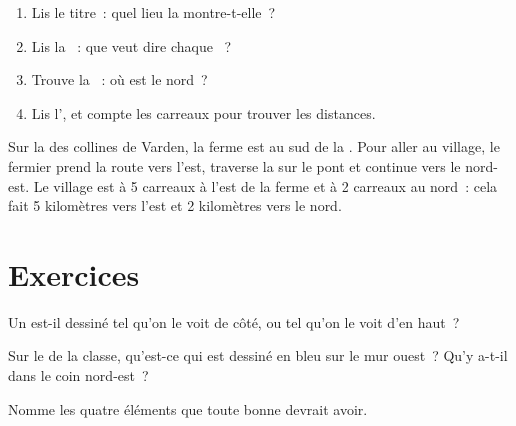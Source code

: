 
\begin{method}\label{met:g2:drawing-to-map:read}
\begin{enumerate}
  \item Lis le titre~: quel lieu la  montre-t-elle~?
  \item Lis la ~: que veut dire chaque ~?
  \item Trouve la ~: où est le nord~?
  \item Lis l', et compte les carreaux pour trouver les distances.
\end{enumerate}
\end{method}

\begin{example}\label{ex:g2:drawing-to-map:farm}
Sur la  des collines de Varden, la ferme est au sud de la .
Pour aller au village, le fermier prend la route vers l'est, traverse la
 sur le pont et continue vers le nord-est. Le village est à
5 carreaux à l'est de la ferme et à 2 carreaux au nord~: cela fait
5 kilomètres vers l'est et 2 kilomètres vers le nord.
\end{example}

\section{Exercices}

\begin{exercise}[$\star$]\label{exo:g2:drawing-to-map:1}
Un  est-il dessiné tel qu'on le voit de côté, ou tel qu'on le voit d'en haut~?
\end{exercise}

\begin{exercise}[$\star$]\label{exo:g2:drawing-to-map:2}
Sur le  de la classe, qu'est-ce qui est dessiné en bleu sur le mur
ouest~? Qu'y a-t-il dans le coin nord-est~?
\end{exercise}

\begin{exercise}[$\star$]\label{exo:g2:drawing-to-map:3}
Nomme les quatre éléments que toute bonne  devrait avoir.
\end{exercise}

